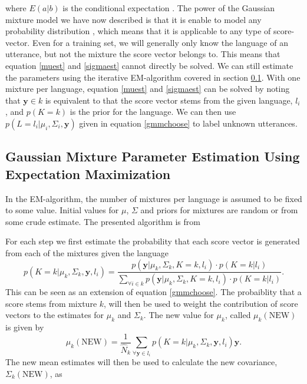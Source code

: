 where $E(a|b)$ is the conditional expectation \cite[p. 94]{talegk}. The power of the Gaussian mixture model we have now described is that it is enable to model any probability distribution \cite[p. 95]{talegk}, which means that it is applicable to any type of score-vector. Even for a training set, we will generally only know the language of an utterance, but not the mixture the score vector belongs to. This means that equation \ref{muest} and \ref{sigmaest} cannot directly be solved. We can still estimate the parameters using the iterative EM-algorithm covered in section \ref{sect:emgmmest}. With one mixture per language, equation \ref{muest} and \ref{sigmaest} can be solved by noting that $\mathbf{y} \in k$ is equivalent to that the score vector stems from the given language, $l_i$, and $p(K=k)$ is the prior for the language. We can then use $p(L=l_i | \mu_i, \Sigma_i, \mathbf{y})$ given in equation \ref{gmmchoose} to label unknown utterances.


\subsection{Gaussian Mixture Parameter Estimation Using Expectation Maximization}
\label{sect:emgmmest}

In the EM-algorithm, the number of mixtures per language is assumed to be fixed to some value. Initial values for $\mu$, $\Sigma$ and priors for mixtures are random or from some crude estimate. The presented algorithm is from \cite[o. 439]{machinelearningbook}

For each step we first estimate the probability that each score vector is generated from each of the mixtures given the language 
\begin{equation}
\label{emprobest}
p(K=k | \mu_k, \Sigma_k, \mathbf{y}, l_i) = \frac{p(\mathbf{y} | \mu_k, \Sigma_k, K=k, l_i)\cdot p(K=k | l_i)}{\sum_{\forall i \in k}
p(\mathbf{y} | \mu_k, \Sigma_k, K=k, l_i)\cdot p(K=k | l_i)}.
\end{equation}
This can be seen as an extension of equation \ref{gmmchoose}. The probaiblity that a score stems from mixture $k$,  will then be used to weight the contribution of score vectors to the estimates for $\mu_k$ and $\Sigma_k$. The new value for $\mu_k$, called $\mu_k(\text{NEW})$ is given by
\begin{equation}
\label{emmuest}
\mu_k(\text{NEW}) = \frac{1}{\hat{N}_k}\sum_{\forall \mathbf{y} \in l_i} p(K=k | \mu_k, \Sigma_k, \mathbf{y}, l_i)\mathbf{y}.
\end{equation}
The new mean estimates will then be used to calculate the new covariance, $\Sigma_k(\text{NEW})$, as

